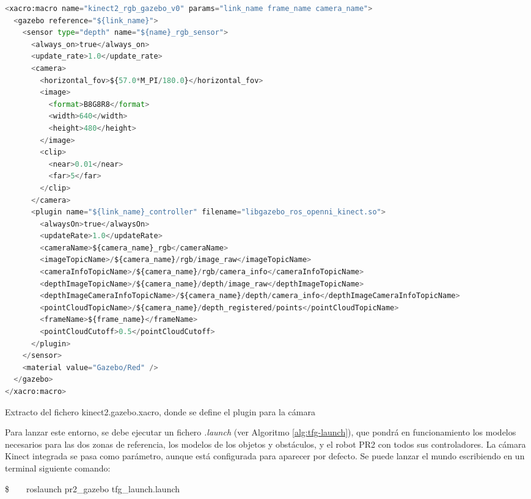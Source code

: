 \documentclass[12pt,spanish,chapterprefix, numbers=noenddot]{book}
\numberwithin{equation}{section}
\numberwithin{figure}{section}
\begin{document}
\begin{algorithm}[htb!]
	\begin{lstlisting}[breaklines=true,language=python]    
<xacro:macro name="kinect2_rgb_gazebo_v0" params="link_name frame_name camera_name">
  <gazebo reference="${link_name}">
    <sensor type="depth" name="${name}_rgb_sensor">
      <always_on>true</always_on>
      <update_rate>1.0</update_rate>
      <camera>
        <horizontal_fov>${57.0*M_PI/180.0}</horizontal_fov>
        <image>
          <format>B8G8R8</format>
          <width>640</width>
          <height>480</height>
        </image>
        <clip>
          <near>0.01</near>
          <far>5</far>
        </clip>
      </camera>
      <plugin name="${link_name}_controller" filename="libgazebo_ros_openni_kinect.so">
        <alwaysOn>true</alwaysOn>
        <updateRate>1.0</updateRate>
        <cameraName>${camera_name}_rgb</cameraName>
        <imageTopicName>/${camera_name}/rgb/image_raw</imageTopicName>
        <cameraInfoTopicName>/${camera_name}/rgb/camera_info</cameraInfoTopicName>
        <depthImageTopicName>/${camera_name}/depth/image_raw</depthImageTopicName>
        <depthImageCameraInfoTopicName>/${camera_name}/depth/camera_info</depthImageCameraInfoTopicName>
        <pointCloudTopicName>/${camera_name}/depth_registered/points</pointCloudTopicName>
        <frameName>${frame_name}</frameName>
        <pointCloudCutoff>0.5</pointCloudCutoff>
      </plugin>
    </sensor>
    <material value="Gazebo/Red" />
  </gazebo>
</xacro:macro>
	\end{lstlisting}
\caption{\label{alg:kinect2-xacro}Extracto del fichero kinect2.gazebo.xacro, donde se define el plugin para la cámara}
\end{algorithm}

Para lanzar este entorno, se debe ejecutar un fichero \textit{.launch} (ver Algoritmo \ref{alg:tfg-launch}), que pondrá en funcionamiento los modelos necesarios para las dos zonas de referencia, los modelos de los objetos y obstáculos, y el robot PR2 con todos sus controladores. La cámara Kinect integrada se pasa como parámetro, aunque está configurada para aparecer por defecto. Se puede lanzar el mundo escribiendo en un terminal siguiente comando:

\$\ \ \ \ roslaunch pr2\_gazebo tfg\_launch.launch
\end{document}
